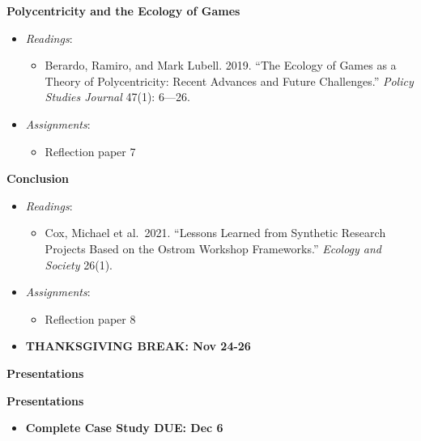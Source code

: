 \week \textbf{Polycentricity and the Ecology of Games}

\begin{itemize}

\item
  \emph{Readings}:

  \begin{itemize}
  
  \item
    Berardo, Ramiro, and Mark Lubell. 2019. ``The Ecology of Games as a
    Theory of Polycentricity: Recent Advances and Future Challenges.''
    \emph{Policy Studies Journal} 47(1): 6---26.
  \end{itemize}
\item
  \emph{Assignments}:

  \begin{itemize}
  
  \item
    Reflection paper 7
  \end{itemize}
\end{itemize}

\week \textbf{Conclusion}

\begin{itemize}

\item
  \emph{Readings}:

  \begin{itemize}
  
  \item
    Cox, Michael et al.~2021. ``Lessons Learned from Synthetic Research
    Projects Based on the Ostrom Workshop Frameworks.'' \emph{Ecology
    and Society} 26(1).
  \end{itemize}
\item
  \emph{Assignments}:

  \begin{itemize}
  
  \item
    Reflection paper 8
  \end{itemize}
\item
  \textbf{THANKSGIVING BREAK: Nov 24-26}
\end{itemize}

\week \textbf{Presentations}

\week \textbf{Presentations}

\begin{itemize}

\item
  \textbf{Complete Case Study DUE: Dec 6}
\end{itemize}
